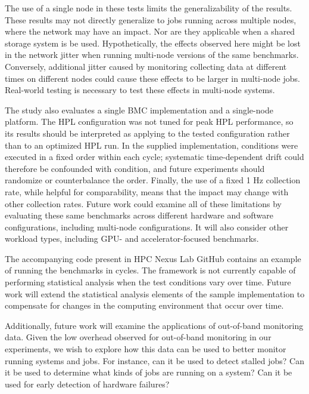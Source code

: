 \documentclass[conference]{IEEEtran}
\begin{document}
The use of a single node in these tests limits the generalizability of the results.
These results may not directly generalize to jobs running across multiple nodes, where the 
network may have an impact. Nor are they applicable when a shared storage system
is be used. Hypothetically, the effects observed here might
be lost in the network jitter when running multi-node versions of the 
same benchmarks. Conversely, additional jitter caused by monitoring collecting data 
at different times on different nodes could cause these effects to be larger in
multi-node jobs. Real-world testing is necessary to test these effects in 
multi-node systems.

The study also evaluates a single BMC implementation and a single-node platform.
The HPL configuration was not tuned for peak HPL performance, so its results should be
interpreted as applying to the tested configuration rather than to an optimized HPL run.
In the supplied implementation, conditions were executed in a fixed order within each cycle; systematic time-dependent drift could therefore be confounded with condition, and future experiments should randomize or counterbalance the order.
Finally, the use of a fixed 1 Hz collection rate, while helpful
for comparability, means that the impact may change with other collection rates.
Future work could examine all of these limitations by evaluating 
these same benchmarks across different hardware and software configurations, including multi-node configurations.
It will also consider other workload types, including GPU- and accelerator-focused benchmarks.

The accompanying code present in HPC Nexus Lab GitHub \cite{HPCNexusLabImpactofMonitoringonHPCWorkloads} 
contains an example of running the benchmarks in cycles. The framework is
not currently capable of performing statistical analysis when the test 
conditions vary over time.
Future work will
extend the statistical analysis elements of the sample implementation to
compensate for changes in the computing environment that occur over time.

Additionally, future work will examine the applications of
out-of-band monitoring data. Given the low overhead observed for out-of-band monitoring in our experiments, we wish to explore how
this data can be used to better monitor running systems and jobs. For instance, can it 
be used to detect stalled jobs? Can it be used to determine what kinds of jobs
are running on a system? Can it be used for early detection of hardware 
failures?
\end{document}
